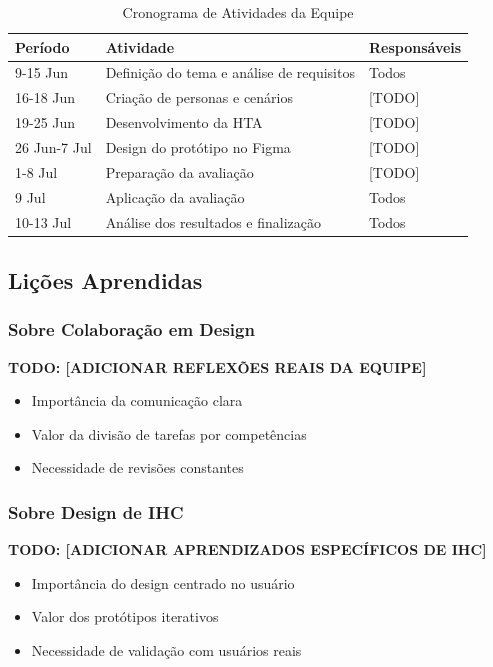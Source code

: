 \documentclass[12pt, a4paper]{report}
\begin{document}
\begin{table}[H]
\centering
\begin{tabular}{|l|l|l|}
\hline
\textbf{Período} & \textbf{Atividade} & \textbf{Responsáveis} \\
\hline
9-15 Jun & Definição do tema e análise de requisitos & Todos \\
\hline
16-18 Jun & Criação de personas e cenários & [TODO] \\
\hline
19-25 Jun & Desenvolvimento da HTA & [TODO] \\
\hline
26 Jun-7 Jul & Design do protótipo no Figma & [TODO] \\
\hline
1-8 Jul & Preparação da avaliação & [TODO] \\
\hline
9 Jul & Aplicação da avaliação & Todos \\
\hline
10-13 Jul & Análise dos resultados e finalização & Todos \\
\hline
\end{tabular}
\caption{Cronograma de Atividades da Equipe}
\label{tab:cronograma}
\end{table}

\subsection{Lições Aprendidas}

\subsubsection{Sobre Colaboração em Design}

\textbf{TODO: [ADICIONAR REFLEXÕES REAIS DA EQUIPE]}

\begin{itemize}
    \item Importância da comunicação clara
    \item Valor da divisão de tarefas por competências
    \item Necessidade de revisões constantes
\end{itemize}

\subsubsection{Sobre Design de IHC}

\textbf{TODO: [ADICIONAR APRENDIZADOS ESPECÍFICOS DE IHC]}

\begin{itemize}
    \item Importância do design centrado no usuário
    \item Valor dos protótipos iterativos
    \item Necessidade de validação com usuários reais
\end{itemize}
\end{document}
